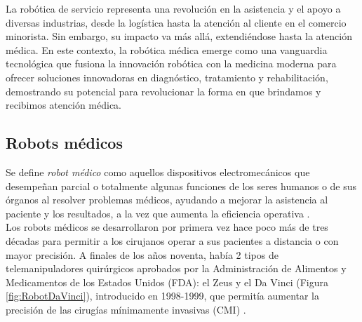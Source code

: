  
   

La robótica de servicio representa una revolución en la asistencia y el apoyo a diversas industrias, desde la logística hasta la atención al cliente en el comercio minorista. Sin embargo, su impacto va más allá, extendiéndose hasta la atención médica. En este contexto, la robótica médica emerge como una vanguardia tecnológica que fusiona la innovación robótica con la medicina moderna para ofrecer soluciones innovadoras en diagnóstico, tratamiento y rehabilitación, demostrando su potencial para revolucionar la forma en que brindamos y recibimos atención médica.
 
\subsection{Robots médicos}
\label{sec:robotica_industrial} 

Se define \textit{robot médico} como aquellos dispositivos electromecánicos que desempeñan parcial o totalmente algunas funciones de los seres humanos o de sus órganos al resolver problemas médicos, ayudando a mejorar la asistencia al paciente y los resultados, a la vez que aumenta la eficiencia operativa \cite{Kraevsky10}.\\

Los robots médicos se desarrollaron por primera vez hace poco más de tres décadas para permitir a los cirujanos operar a sus pacientes a distancia o con mayor precisión. A finales de los años noventa, había 2 tipos de telemanipuladores quirúrgicos aprobados por la Administración de Alimentos y Medicamentos de los Estados Unidos (FDA): el Zeus y el Da Vinci (Figura \ref{fig:RobotDaVinci}), introducido en 1998-1999, que permitía aumentar la precisión de las cirugías mínimamente invasivas (CMI) \cite{Romero20}.\\


